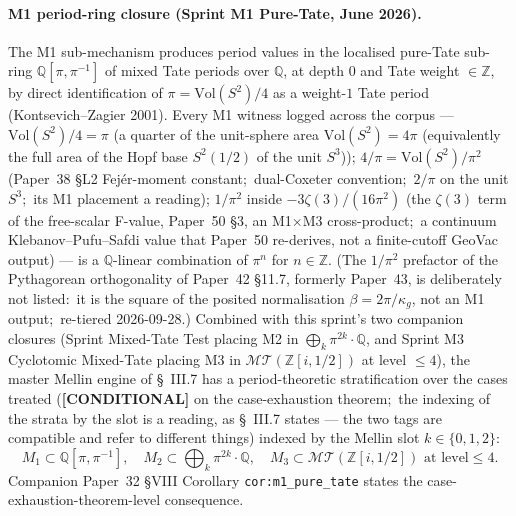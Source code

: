 \documentclass[aps,pra,twocolumn,superscriptaddress,longbibliography]{revtex4-2}
\begin{document}
\paragraph{M1 period-ring closure (Sprint M1 Pure-Tate, June 2026).}
The M1 sub-mechanism produces period values in the localised
pure-Tate sub-ring $\mathbb{Q}[\pi, \pi^{-1}]$ of mixed Tate periods
over $\mathbb{Q}$, at depth $0$ and Tate weight $\in \mathbb{Z}$, by
direct identification of $\pi = \mathrm{Vol}(S^2)/4$ as a weight-$1$
Tate period (Kontsevich--Zagier 2001).  Every M1 witness logged
across the corpus --- $\mathrm{Vol}(S^2)/4 = \pi$ (a quarter of the unit-sphere area $\mathrm{Vol}(S^2) = 4\pi$ (equivalently the full area of the Hopf base $S^2(1/2)$ of the unit $S^3$)); $4/\pi = \mathrm{Vol}(S^2)/\pi^2$
(Paper~38 §L2 Fej\'er-moment constant;\ dual-Coxeter convention;\ $2/\pi$ on the unit $S^3$;\ its M1 placement a reading); $1/\pi^2$ inside
$-3\zeta(3)/(16\pi^2)$ (the $\zeta(3)$ term of the free-scalar F-value, Paper~50 §3, an M1$\times$M3
cross-product;\ a continuum Klebanov--Pufu--Safdi value that Paper~50
re-derives, not a finite-cutoff GeoVac output) --- is a $\mathbb{Q}$-linear combination of $\pi^n$
for $n \in \mathbb{Z}$.  (The $1/\pi^2$ prefactor of the Pythagorean
orthogonality of Paper~42 §11.7, formerly Paper~43, is deliberately not
listed:\ it is the square of the posited normalisation
$\beta = 2\pi/\kappa_g$, not an M1 output;\ re-tiered 2026-09-28.)  Combined with this sprint's two companion
closures (Sprint Mixed-Tate Test placing M2 in
$\bigoplus_k \pi^{2k}\cdot\mathbb{Q}$, and Sprint M3 Cyclotomic
Mixed-Tate placing M3 in $\mathcal{MT}(\mathbb{Z}[i, 1/2])$ at level
$\le 4$), the master Mellin engine of \S~III.7 has a period-theoretic
stratification over the cases treated (\textbf{[CONDITIONAL]} on the
case-exhaustion theorem;\ the indexing of the strata by the slot is a
reading, as \S~III.7 states --- the two tags are compatible and refer
to different things) indexed by the Mellin slot
$k \in \{0, 1, 2\}$:
\begin{equation*}
M_1 \subset \mathbb{Q}[\pi, \pi^{-1}], \quad
M_2 \subset \bigoplus_k \pi^{2k}\cdot\mathbb{Q}, \quad
M_3 \subset \mathcal{MT}(\mathbb{Z}[i, 1/2]) \text{ at level} \le 4.
\end{equation*}
Companion Paper~32 §VIII Corollary \texttt{cor:m1\_pure\_tate} states
the case-exhaustion-theorem-level consequence.
\end{document}
